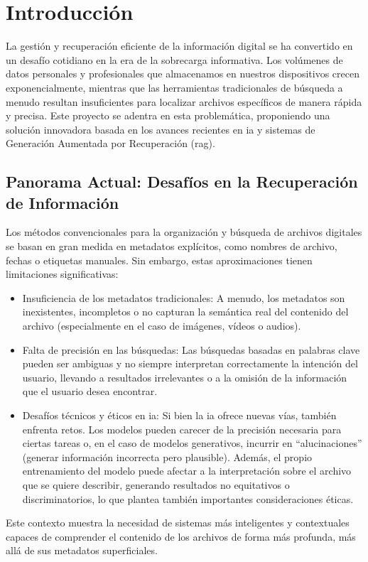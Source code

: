 
\chapter{Introducción}

La gestión y recuperación eficiente de la información digital se ha convertido en un desafío cotidiano en la era de la sobrecarga informativa. Los volúmenes de datos personales y profesionales que almacenamos en nuestros dispositivos crecen exponencialmente, mientras que las herramientas tradicionales de búsqueda a menudo resultan insuficientes para localizar archivos específicos de manera rápida y precisa. Este proyecto se adentra en esta problemática, proponiendo una solución innovadora basada en los avances recientes en \gls{ia} y sistemas de Generación Aumentada por Recuperación (\gls{rag}).

\section{Panorama Actual: Desafíos en la Recuperación de Información}
Los métodos convencionales para la organización y búsqueda de archivos digitales se basan en gran medida en metadatos explícitos, como nombres de archivo, fechas o etiquetas manuales. Sin embargo, estas aproximaciones tienen limitaciones significativas:
\begin{itemize}
    \item Insuficiencia de los metadatos tradicionales: A menudo, los metadatos son inexistentes, incompletos o no capturan la semántica real del contenido del archivo (especialmente en el caso de imágenes, vídeos o audios).
    \item Falta de precisión en las búsquedas: Las búsquedas basadas en palabras clave pueden ser ambiguas y no siempre interpretan correctamente la intención del usuario, llevando a resultados irrelevantes o a la omisión de la información que el usuario desea encontrar.
    \item Desafíos técnicos y éticos en \gls{ia}: Si bien la \gls{ia} ofrece nuevas vías, también enfrenta retos. Los modelos pueden carecer de la precisión necesaria para ciertas tareas o, en el caso de modelos generativos, incurrir en ``alucinaciones'' (generar información incorrecta pero plausible). Además, el propio entrenamiento del modelo puede afectar a la interpretación sobre el archivo que se quiere describir, generando resultados no equitativos o discriminatorios, lo que plantea también importantes consideraciones éticas.
\end{itemize}
Este contexto muestra la necesidad de sistemas más inteligentes y contextuales capaces de comprender el contenido de los archivos de forma más profunda, más allá de sus metadatos superficiales.


